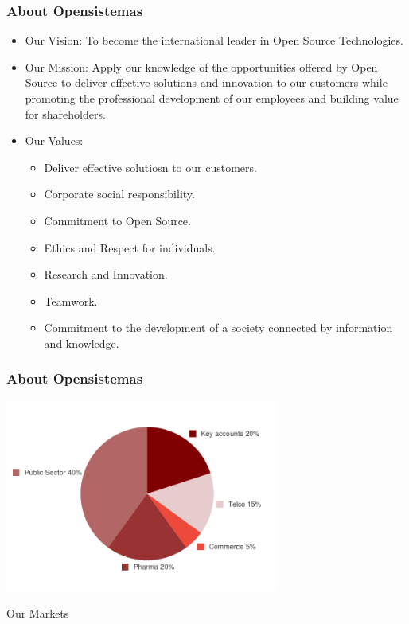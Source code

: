 \documentclass{beamer}
\begin{document}
\begin{frame}
\frametitle{About Opensistemas}
\begin{itemize}
\item Our Vision:
\pause
To become the international leader in Open Source Technologies.
\pause
\item Our Mission:
\pause
Apply our knowledge of the opportunities offered by Open Source to deliver
effective solutions and innovation to our customers while promoting the
professional development of our employees and building value for 
shareholders.
\pause
\item Our Values:
\pause
\begin{itemize}
\item Deliver effective solutiosn to our customers.
\item Corporate social responsibility.
\item Commitment to Open Source.
\item Ethics and Respect for individuals.
\item Research and Innovation.
\item Teamwork.
\item Commitment to the development of a society connected by information
and knowledge.
\end{itemize}
\end{itemize}
\end{frame}

\begin{frame}
\frametitle{About Opensistemas}
\begin{center}
\includegraphics[width=9cm]{figs/opensistemas-markets}
\end{center}
\begin{center}
Our Markets
\end{center}
\end{frame}
\end{document}

